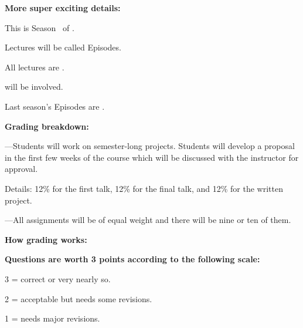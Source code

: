   



  \textbf{More super exciting details:}
    
    
      This is Season \courseseason\ of \coursename.
    
      Lectures will be called Episodes.
    
      All lectures are 
      .
    
       will be involved.
    
  


    
    
      Last season's Episodes are .
    
  



  \textbf{Grading breakdown:}

  
    
     
      ---Students will 
      work on semester-long projects.  Students will develop a
      proposal in the first few weeks of the course which will be discussed
      with the instructor for approval.  

      \smallskip

      Details: 12\% for the first talk, 12\% for the final talk,
      and 12\% for the written project.
    
  
  
    
     
      ---All assignments will be 
      of equal weight and there will be nine or ten of them.
    
  
  
    
     
    
  


  \textbf{How grading works:}

  \textbf{Questions are worth 3 points according to the following scale:}
    
     
      3 = correct or very nearly so.
     
      2 = acceptable but needs some revisions.
     
      1 = needs major revisions.
     
